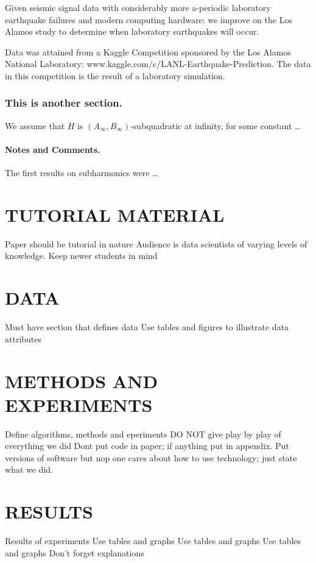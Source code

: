 \documentclass[]{llncs}
\begin{document}
Given seismic signal data with considerably more a-periodic laboratory earthquake failures and modern computing hardware; we improve on the Los Alamos study\cite{Bertrand} to determine when laboratory earthquakes will occur.





Data was attained from a Kaggle Competition sponsored by the Los Alamos National Laboratory:  www.kaggle.com/c/LANL-Earthquake-Prediction. The data in this competition is the result of a laboratory simulation.
\subsubsection*{This is another section.}
We assume that $H$ is $\left(A_{\infty}, B_{\infty}\right)$-subqua\-dra\-tic at infinity, for some constant \dots
\paragraph{Notes and Comments.} The first results on subharmonics were \dots
\section{TUTORIAL MATERIAL}
Paper should be tutorial in nature
Audience is data scientists of varying levels of knowledge. Keep newer students in mind
\section{DATA}
Must have section that defines data
Use tables and figures to illustrate data attributes
\section{METHODS AND EXPERIMENTS}
Define algorithms, methods and eperiments
DO NOT give play by play of everything we did
Dont put code in paper; if anything put in appendix.
Put versions of software but nop one cares about how to use technology; just state what we did.
\section{RESULTS}
Results of experiments
Use tables and graphs
Use tables and graphs
Use tables and graphs
Don't forget explanations
\end{document}
